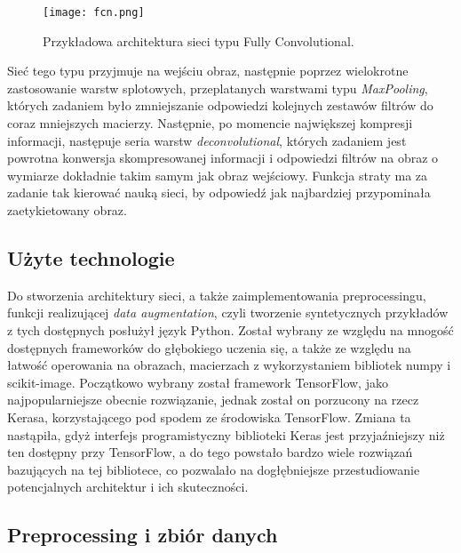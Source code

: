 \documentclass{article}
\begin{document}
\begin{figure}[H]
\begin{center}
\texttt{[image: fcn.png]}
\end{center}
\caption{Przykładowa architektura sieci typu Fully Convolutional.}
\label{fig:fcn}
\end{figure}

Sieć tego typu przyjmuje na wejściu obraz, następnie poprzez wielokrotne zastosowanie warstw splotowych, przeplatanych warstwami typu \textit{MaxPooling}, których zadaniem było zmniejszanie odpowiedzi kolejnych zestawów filtrów do coraz mniejszych macierzy. Następnie, po momencie największej kompresji informacji, następuje seria warstw \textit{deconvolutional}, których zadaniem jest powrotna konwersja skompresowanej informacji i odpowiedzi filtrów na obraz o wymiarze dokładnie takim samym jak obraz wejściowy. Funkcja straty ma za zadanie tak kierować nauką sieci, by odpowiedź jak najbardziej przypominała zaetykietowany obraz.

\subsection{Użyte technologie}

Do stworzenia architektury sieci, a także zaimplementowania preprocessingu, funkcji realizującej \textit{data augmentation}, czyli tworzenie syntetycznych przykładów z tych dostępnych posłużył język Python. Został wybrany ze względu na mnogość dostępnych frameworków do głębokiego uczenia się, a także ze względu na łatwość operowania na obrazach, macierzach z wykorzystaniem bibliotek numpy i scikit-image. Początkowo wybrany został framework TensorFlow, jako najpopularniejsze obecnie rozwiązanie, jednak został on porzucony na rzecz Kerasa, korzystającego pod spodem ze środowiska TensorFlow. Zmiana ta nastąpiła, gdyż interfejs programistyczny biblioteki Keras jest przyjaźniejszy niż ten dostępny przy TensorFlow, a do tego powstało bardzo wiele rozwiązań bazujących na tej bibliotece, co pozwalało na dogłębniejsze przestudiowanie potencjalnych architektur i ich skuteczności.

\subsection{Preprocessing i zbiór danych}
\end{document}
